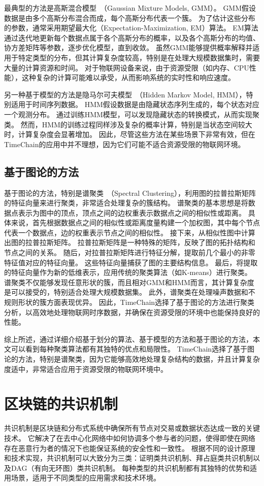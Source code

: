最典型的方法是高斯混合模型~\cite{kanungo2002efficient}（Gaussian Mixture Models, GMM）。
GMM假设数据是由多个高斯分布混合而成，每个高斯分布代表一个簇。
为了估计这些分布的参数，通常采用期望最大化（Expectation-Maximization, EM）算法。
EM算法通过迭代地更新每个数据点属于各个高斯分布的概率，以及各个高斯分布的均值、协方差矩阵等参数，逐步优化模型，直到收敛。
虽然GMM能够提供概率解释并适用于特定类型的分布，但其计算复杂度较高，特别是在处理大规模数据集时，需要大量的计算资源和时间。
对于物联网设备来说，由于资源受限（如内存、CPU性能），这种复杂的计算可能难以承受，从而影响系统的实时性和响应速度。

另一种基于模型的方法是隐马尔可夫模型~\cite{he2010laplacian}（Hidden Markov Model, HMM），特别适用于时间序列数据。
HMM假设数据是由隐藏状态序列生成的，每个状态对应一个观测分布。
通过训练HMM模型，可以发现隐藏状态的转换模式，从而实现聚类。
然而，HMM的训练过程同样涉及复杂的概率计算，特别是当状态空间较大时，计算复杂度会显著增加。
因此，尽管这些方法在某些场景下非常有效，但在TimeChain的应用中并不理想，因为它们可能不适合资源受限的物联网环境。

\subsection{基于图论的方法}
基于图论的方法，特别是谱聚类~\cite{von2007tutorial}（Spectral Clustering），利用图的拉普拉斯矩阵的特征向量来进行聚类，非常适合处理复杂的簇结构。
谱聚类的基本思想是将数据点表示为图中的顶点，顶点之间的边权重表示数据点之间的相似性或距离。
具体来说，首先根据数据点之间的相似性或距离度量构建一个加权图，其中每个节点代表一个数据点，边的权重表示节点之间的相似性。
接下来，从相似性图中计算出图的拉普拉斯矩阵。
拉普拉斯矩阵是一种特殊的矩阵，反映了图的拓扑结构和节点之间的关系。
随后，对拉普拉斯矩阵进行特征分解，提取前几个最小的非零特征值对应的特征向量。
这些特征向量捕获了图的主要结构信息。
最后，将提取的特征向量作为新的低维表示，应用传统的聚类算法（如K-means）进行聚类。
谱聚类不仅能够发现任意形状的簇，而且相对GMM和HMM而言，其计算复杂度是可以接受的，特别适合处理大规模数据集。
此外，谱聚类在处理噪声数据和不规则形状的簇方面表现优异。
因此，TimeChain选择了基于图论的方法进行聚类分析，以高效地处理物联网时序数据，并确保在资源受限的环境中也能保持良好的性能。

综上所述，通过详细介绍基于划分的算法、基于模型的方法和基于图论的方法，本文可以看到每种聚类算法都有其独特的优点和局限性。
TimeChain选择了基于图论的方法，特别是谱聚类，因为它能够高效地处理复杂结构的数据，并且计算复杂度适中，非常适合应用于资源受限的物联网环境中。

\section{区块链的共识机制}
共识机制是区块链和分布式系统中确保所有节点对交易或数据状态达成一致的关键技术。
它解决了在去中心化网络中如何协调多个参与者的问题，使得即使在网络存在恶意行为者的情况下也能保证系统的安全性和一致性。
根据不同的设计原理和技术实现，共识机制可以大致分为三类：证明类共识机制、拜占庭类共识机制以及DAG（有向无环图）类共识机制。
每种类型的共识机制都有其独特的优势和适用场景，适用于不同类型的应用需求和技术环境。

